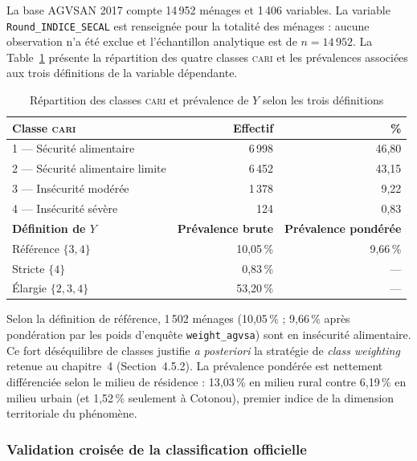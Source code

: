 La base AGVSAN 2017 compte 14\,952 ménages et 1\,406 variables. La variable
\texttt{Round\_INDICE\_SECAL} est renseignée pour la totalité des ménages :
aucune observation n'a été exclue et l'échantillon analytique est de
$n = 14\,952$. La Table~\ref{tab:res-repartition-y} présente la répartition des
quatre classes \textsc{cari} et les prévalences associées aux trois définitions
de la variable dépendante.

\begin{table}[H]
\centering
\caption{Répartition des classes \textsc{cari} et prévalence de $Y$ selon les trois définitions}
\label{tab:res-repartition-y}
\small\setlength{\tabcolsep}{4pt}
\begin{tabular}{lrr}
\toprule
\textbf{Classe \textsc{cari}} & \textbf{Effectif} & \textbf{\%} \\
\midrule
1 — Sécurité alimentaire          & 6\,998 & 46,80 \\
2 — Sécurité alimentaire limite   & 6\,452 & 43,15 \\
3 — Insécurité modérée            & 1\,378 &  9,22 \\
4 — Insécurité sévère             &    124 &  0,83 \\
\midrule
\textbf{Définition de $Y$}        & \textbf{Prévalence brute} & \textbf{Prévalence pondérée} \\
\midrule
Référence $\{3,4\}$               & 10,05\,\% & 9,66\,\% \\
Stricte $\{4\}$                   &  0,83\,\% & --- \\
Élargie $\{2,3,4\}$               & 53,20\,\% & --- \\
\bottomrule
\end{tabular}
\end{table}

Selon la définition de référence, 1\,502 ménages (10,05\,\% ; 9,66\,\% après
pondération par les poids d'enquête \texttt{weight\_agvsa}) sont en insécurité
alimentaire. Ce fort déséquilibre de classes justifie \emph{a posteriori} la
stratégie de \emph{class weighting} retenue au chapitre~4 (Section~4.5.2). La
prévalence pondérée est nettement différenciée selon le milieu de résidence :
13,03\,\% en milieu rural contre 6,19\,\% en milieu urbain (et 1,52\,\%
seulement à Cotonou), premier indice de la dimension territoriale du phénomène.

\subsubsection{Validation croisée de la classification officielle}


